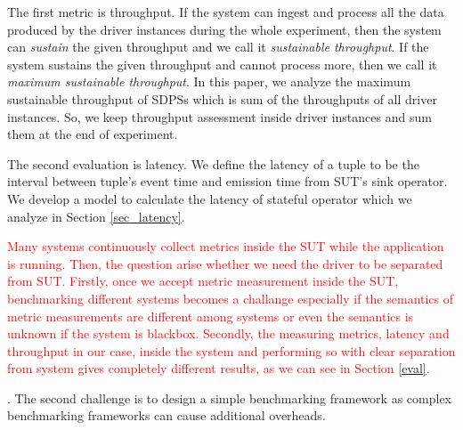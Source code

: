 The first metric is throughput. 
If the system can ingest and process all the data produced by the driver instances during the whole experiment, then the system can \textit{sustain} the given throughput and we call it \textit{sustainable throughput}. If the system sustains the given throughput and cannot process more, then we call it \textit{maximum sustainable throughput}. In this paper, we analyze the maximum sustainable throughput of SDPSs which is  sum of the throughputs of all driver instances. So, we keep throughput assessment inside driver instances and sum them at the end of experiment. 



The second evaluation is latency. We define the latency of a tuple to be the interval between tuple's event time and emission time from SUT's sink operator. We develop a model to calculate the latency of stateful operator  which we analyze in Section \ref{sec_latency}.

\textcolor{red}{ Many systems continuously collect metrics inside the SUT while the application is running. Then, the question arise whether we need the driver to be separated from SUT. Firstly, once we accept metric measurement inside the SUT, benchmarking different systems becomes a challange especially if the semantics of metric measurements are different among systems or even the semantics is unknown if the system is blackbox. Secondly, the measuring metrics, latency and throughput in our case, inside the system and performing so with clear separation from system gives completely different results, as we can see in Section \ref{eval}.  }


. The second challenge is to design a simple benchmarking framework as complex benchmarking frameworks can  cause  additional overheads.  

